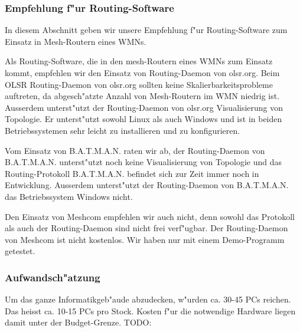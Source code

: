 \subsubsection{Empfehlung f"ur Routing-Software}

In diesem Abschnitt geben wir unsere Empfehlung f"ur Routing-Software
zum Einsatz in Mesh-Routern eines WMNs.

Als Routing-Software, die in den mesh-Routern eines WMNs zum Einsatz kommt,
empfehlen wir den Einsatz von Routing-Daemon von olsr.org. Beim OLSR
Routing-Daemon von olsr.org sollten keine Skalierbarkeitsprobleme auftreten,
da abgesch"atzte Anzahl von Mesh-Routern im WMN niedrig ist. Ausserdem
unterst"utzt der Routing-Daemon von olsr.org Visualisierung von Topologie.
Er unterst"utzt sowohl Linux als auch Windows und ist in beiden
Betriebssystemen sehr leicht zu installieren und zu konfigurieren.

Vom Einsatz von B.A.T.M.A.N. raten wir ab, der Routing-Daemon von
B.A.T.M.A.N. unterst"utzt noch keine Visualisierung von Topologie
und das Routing-Protokoll B.A.T.M.A.N.  befindet sich zur Zeit immer
noch in Entwicklung.  Ausserdem unterst"utzt der Routing-Daemon von
B.A.T.M.A.N. das Betriebssystem Windows nicht.

Den Einsatz von Meshcom empfehlen wir auch nicht, denn sowohl das
Protokoll als auch der Routing-Daemon sind nicht frei verf"ugbar.
Der Routing-Daemon von Meshcom ist nicht kostenlos. Wir haben nur mit
einem Demo-Programm getestet.

\subsubsection{Aufwandsch"atzung}
\label{sec:Aufwandsch"atzung}
	
Um das ganze Informatikgeb"aude abzudecken, w"urden ca. 30-45 PCs reichen.
Das heisst ca. 10-15 PCs pro Stock. Kosten f"ur die notwendige Hardware
liegen damit unter der Budget-Grenze.
TODO: 	
